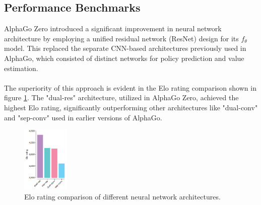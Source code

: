 \subsection{Performance Benchmarks}

AlphaGo Zero introduced a significant improvement in neural network architecture by employing a unified residual network (ResNet) design for its $f_\theta$ model. This replaced the separate CNN-based architectures previously used in AlphaGo, which consisted of distinct networks for policy prediction and value estimation. 
\\\\
The superiority of this approach is evident in the Elo rating comparison shown in figure \ref{fig:results_agz}. The "dual-res" architecture, utilized in AlphaGo Zero, achieved the highest Elo rating, significantly outperforming other architectures like "dual-conv" and "sep-conv" used in earlier versions of AlphaGo.

\begin{figure}[ht]
    \centering
    \includegraphics[width=0.20\textwidth]{sections/5AlphaGo Zero/Results_agz.png}
    \caption{Elo rating comparison of different neural network architectures.}
    \label{fig:results_agz}
\end{figure}


